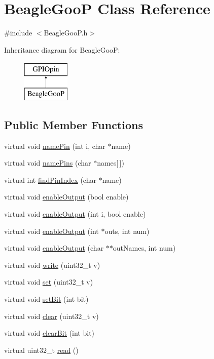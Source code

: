 \hypertarget{class_beagle_goo_p}{\section{Beagle\-Goo\-P Class Reference}
\label{class_beagle_goo_p}
}


{\ttfamily \#include $<$Beagle\-Goo\-P.\-h$>$}

Inheritance diagram for Beagle\-Goo\-P\-:\begin{figure}[H]
\begin{center}
\leavevmode
\includegraphics[height=2.000000cm]{class_beagle_goo_p}
\end{center}
\end{figure}
\subsection*{Public Member Functions}
\begin{DoxyCompactItemize}
\item 
virtual void \hyperlink{class_beagle_goo_p_a7c5b14071a87506c912b6d14f139136f}{name\-Pin} (int i, char $\ast$name)
\item 
virtual void \hyperlink{class_beagle_goo_p_a716e0b3664ed88ad427b329524311e03}{name\-Pins} (char $\ast$names\mbox{[}$\,$\mbox{]})
\item 
virtual int \hyperlink{class_beagle_goo_p_a91d2290d2c289b310d24f959371d3414}{find\-Pin\-Index} (char $\ast$name)
\item 
virtual void \hyperlink{class_beagle_goo_p_ac4d38d90c905cf318f5017b3c18203cd}{enable\-Output} (bool enable)
\item 
virtual void \hyperlink{class_beagle_goo_p_a2900cd6005cd471066d598e4866ad66f}{enable\-Output} (int i, bool enable)
\item 
virtual void \hyperlink{class_beagle_goo_p_a418b335ab7c154291a543fe18949f730}{enable\-Output} (int $\ast$outs, int num)
\item 
virtual void \hyperlink{class_beagle_goo_p_a4127207e947efe8952540fd69b949b35}{enable\-Output} (char $\ast$$\ast$out\-Names, int num)
\item 
virtual void \hyperlink{class_beagle_goo_p_a5da234ad09723ae929135e96e32cf497}{write} (uint32\-\_\-t v)
\item 
virtual void \hyperlink{class_beagle_goo_p_afa97c0b593fa9032c873654ee40140f5}{set} (uint32\-\_\-t v)
\item 
virtual void \hyperlink{class_beagle_goo_p_a8997d7bc2665b7cbd100abe613657e94}{set\-Bit} (int bit)
\item 
virtual void \hyperlink{class_beagle_goo_p_a39772670c58f71b5d7e4ca9e39eb8d86}{clear} (uint32\-\_\-t v)
\item 
virtual void \hyperlink{class_beagle_goo_p_a00a85a024ac1e9a3dbf04d4b065cc16a}{clear\-Bit} (int bit)
\item 
virtual uint32\-\_\-t \hyperlink{class_beagle_goo_p_a4a6ed00aa61f7d81de93cb880ba93d63}{read} ()
\end{DoxyCompactItemize}
